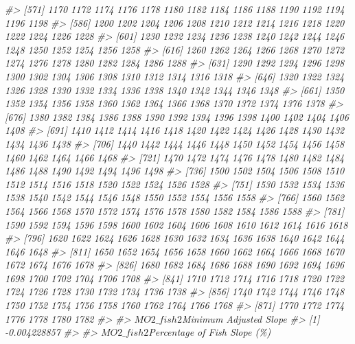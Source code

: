 \documentclass[
]{article}
\newenvironment{Shaded}{\begin{snugshade}}{\end{snugshade}}
\newcommand{\CommentTok}[1]{\textcolor[rgb]{0.56,0.35,0.01}{\textit{#1}}}
\begin{document}
\begin{Shaded}
\begin{Highlighting}[]
\CommentTok{\#\textgreater{} [571] 1170 1172 1174 1176 1178 1180 1182 1184 1186 1188 1190 1192 1194 1196 1198}
\CommentTok{\#\textgreater{} [586] 1200 1202 1204 1206 1208 1210 1212 1214 1216 1218 1220 1222 1224 1226 1228}
\CommentTok{\#\textgreater{} [601] 1230 1232 1234 1236 1238 1240 1242 1244 1246 1248 1250 1252 1254 1256 1258}
\CommentTok{\#\textgreater{} [616] 1260 1262 1264 1266 1268 1270 1272 1274 1276 1278 1280 1282 1284 1286 1288}
\CommentTok{\#\textgreater{} [631] 1290 1292 1294 1296 1298 1300 1302 1304 1306 1308 1310 1312 1314 1316 1318}
\CommentTok{\#\textgreater{} [646] 1320 1322 1324 1326 1328 1330 1332 1334 1336 1338 1340 1342 1344 1346 1348}
\CommentTok{\#\textgreater{} [661] 1350 1352 1354 1356 1358 1360 1362 1364 1366 1368 1370 1372 1374 1376 1378}
\CommentTok{\#\textgreater{} [676] 1380 1382 1384 1386 1388 1390 1392 1394 1396 1398 1400 1402 1404 1406 1408}
\CommentTok{\#\textgreater{} [691] 1410 1412 1414 1416 1418 1420 1422 1424 1426 1428 1430 1432 1434 1436 1438}
\CommentTok{\#\textgreater{} [706] 1440 1442 1444 1446 1448 1450 1452 1454 1456 1458 1460 1462 1464 1466 1468}
\CommentTok{\#\textgreater{} [721] 1470 1472 1474 1476 1478 1480 1482 1484 1486 1488 1490 1492 1494 1496 1498}
\CommentTok{\#\textgreater{} [736] 1500 1502 1504 1506 1508 1510 1512 1514 1516 1518 1520 1522 1524 1526 1528}
\CommentTok{\#\textgreater{} [751] 1530 1532 1534 1536 1538 1540 1542 1544 1546 1548 1550 1552 1554 1556 1558}
\CommentTok{\#\textgreater{} [766] 1560 1562 1564 1566 1568 1570 1572 1574 1576 1578 1580 1582 1584 1586 1588}
\CommentTok{\#\textgreater{} [781] 1590 1592 1594 1596 1598 1600 1602 1604 1606 1608 1610 1612 1614 1616 1618}
\CommentTok{\#\textgreater{} [796] 1620 1622 1624 1626 1628 1630 1632 1634 1636 1638 1640 1642 1644 1646 1648}
\CommentTok{\#\textgreater{} [811] 1650 1652 1654 1656 1658 1660 1662 1664 1666 1668 1670 1672 1674 1676 1678}
\CommentTok{\#\textgreater{} [826] 1680 1682 1684 1686 1688 1690 1692 1694 1696 1698 1700 1702 1704 1706 1708}
\CommentTok{\#\textgreater{} [841] 1710 1712 1714 1716 1718 1720 1722 1724 1726 1728 1730 1732 1734 1736 1738}
\CommentTok{\#\textgreater{} [856] 1740 1742 1744 1746 1748 1750 1752 1754 1756 1758 1760 1762 1764 1766 1768}
\CommentTok{\#\textgreater{} [871] 1770 1772 1774 1776 1778 1780 1782}
\CommentTok{\#\textgreater{} }
\CommentTok{\#\textgreater{} $MO2\_fish2$\textasciigrave{}Minimum Adjusted Slope\textasciigrave{}}
\CommentTok{\#\textgreater{} [1] {-}0.004228857}
\CommentTok{\#\textgreater{} }
\CommentTok{\#\textgreater{} $MO2\_fish2$\textasciigrave{}Percentage of Fish Slope (\%)\textasciigrave{}}

\end{Highlighting}
\end{Shaded}
\end{document}
